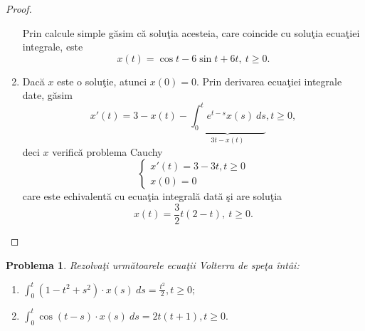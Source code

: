 \documentclass[a4paper,12pt,oneside]{report}
\newtheorem{problem}{Problema}
\begin{document}
\begin{proof}
\begin{enumerate}[label=(\alph*)]
        Prin calcule simple g\u{a}sim c\u{a} solu\c{t}ia acesteia, care coincide cu solu\c{t}ia ecua\c{t}iei integrale, este
\begin{displaymath}
x\left ( t \right ) = \cos t - 6 \sin t  + 6t,~ t\geq 0.
\end{displaymath}
  \item Dac\u{a} $x$ este o solu\c{t}ie, atunci \(x\left ( 0 \right ) = 0\). Prin derivarea  ecua\c{t}iei integrale date, g\u{a}sim
\begin{displaymath}
{x}'\left ( t \right ) = 3 - x\left ( t \right ) - \underbrace{\int_{0}^{t}e^{t-s}x\left ( s \right )\ ds}_{3t -x\left ( t \right )}, t\geq 0,
\end{displaymath}
deci $x$ verific\u{a} problema Cauchy
        \begin{displaymath}
        	\left\{\begin{matrix}
        	{x}'\left ( t \right ) = 3 - 3t , t\geq 0\\
        	x\left ( 0 \right ) = 0
        	\end{matrix}\right.
        \end{displaymath}
care este echivalent\u{a} cu ecua\c{t}ia integral\u{a} dat\u{a} \c{s}i are solu\c{t}ia
\begin{displaymath}
x\left ( t \right ) = \frac{3}{2}t\left ( 2-t \right ),~ t\geq 0.
\end{displaymath}
\end{enumerate}

\end{proof}
\begin{problem}
Rezolva\c{t}i urm\u{a}toarele ecua\c{t}ii Volterra de spe\c{t}a \^{i}nt\^{a}i:
  	      			      			      			      	
\begin{enumerate}[label=(\alph*)]
  \item \(\int_{0}^{t}\left ( 1 - t^{2}  + s^{2}\right ) \cdot  x\left ( s \right ) \ ds  = \frac{t^{2}}{2}, t\geq 0;\)
  \item \(\int_{0}^{t}\cos \left ( t- s \right ) \cdot  x\left ( s \right ) \ ds  = 2t\left ( t+1 \right ), t\geq 0.\)
  \end{enumerate}
\end{problem}
  	      			      			      			      	
\end{document}
